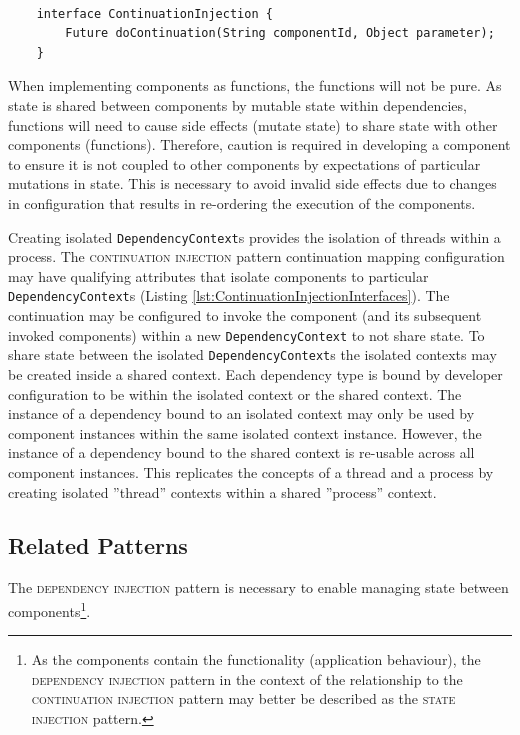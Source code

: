 \documentclass[prodmode]{style/acmlarge}
\begin{document}
\begin{lstlisting}[float,label=lst:ContinuationInjectionInterface]

    interface ContinuationInjection {
        Future doContinuation(String componentId, Object parameter);
    }
\end{lstlisting}

When implementing components as functions, the functions will not be pure.  As
state is shared between components by mutable state within dependencies,
functions will need to cause side effects (mutate state) to share state with
other components (functions).  Therefore, caution is required in developing a
component to ensure it is not coupled to other components by expectations of
particular mutations in state.  This is necessary to avoid invalid side effects
due to changes in configuration that results in re-ordering the execution of the
components.

Creating isolated \texttt{DependencyContext}s provides the isolation of threads
within a process.  The \textsc{continuation injection} pattern continuation
mapping configuration may have qualifying attributes that isolate components to
particular \texttt{DependencyContext}s (Listing
\ref{lst:ContinuationInjectionInterfaces}).  The continuation may be configured
to invoke the component (and its subsequent invoked components) within a new
\texttt{DependencyContext} to not share state.  To share state between the
isolated \texttt{Depend\-ency\-Context}s the isolated contexts may be created
inside a shared context.  Each dependency type is bound by developer
configuration to be within the isolated context or the shared context.  The
instance of a dependency bound to an isolated context may only be used by
component instances within the same isolated context instance.
However, the instance of a dependency bound to the shared context is re-usable
across all component instances.  This replicates the concepts of a thread and a
process by creating isolated ''thread'' contexts within a shared ''process''
context.


\subsection{Related Patterns}

The \textsc{dependency injection} pattern \cite{ioc} is necessary to enable
managing state between components\footnote{As the components contain the
functionality (application behaviour), the \textsc{dependency injection} pattern
in the context of the relationship to the \textsc{continuation injection}
pattern may better be described as the \textsc{state injection} pattern.}.
\end{document}
